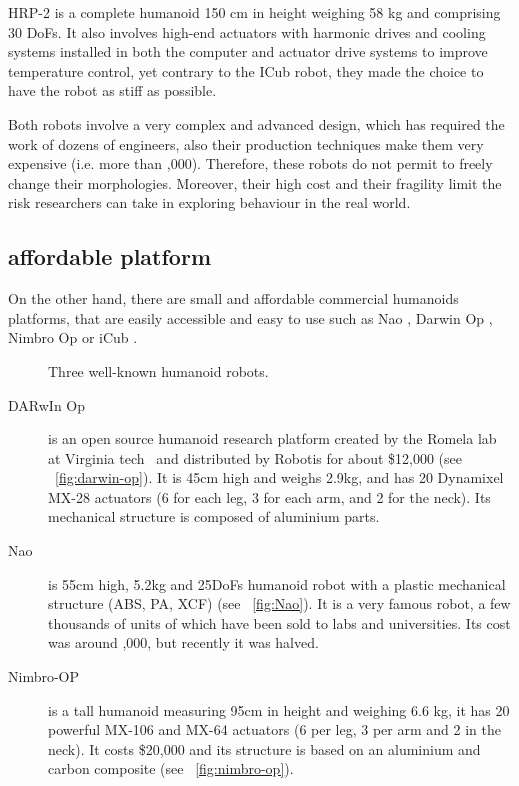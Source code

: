 HRP-2 is a complete humanoid 150 cm in height weighing 58 kg and comprising 30 DoFs. It also involves high-end actuators with harmonic drives and cooling systems installed in both the computer and actuator drive systems to improve temperature control, yet contrary to the ICub robot, they made the choice to have the robot as stiff as possible.

Both robots involve a very complex and advanced design, which has required the work of dozens of engineers, also their production techniques make them very expensive (i.e. more than ,000). Therefore, these robots do not permit to freely change their morphologies. Moreover, their high cost and their fragility limit the risk researchers can take in exploring behaviour in the real world.



\subsection{affordable platform} %

On the other hand, there are small and affordable commercial humanoids platforms, that are easily accessible and easy to use such as Nao \cite{gouaillier2008nao}, Darwin Op \cite{ha2011development}, Nimbro Op \cite{schwarznimbro} or iCub \cite{metta2008icub}.

\begin{figure}[tb]
\centering
    \hfil
    \hfil
    \caption{Three well-known humanoid robots.}
    \label{fig:kumotek_robots}
\end{figure}


\begin{description}
    \item[DARwIn Op] is an open source humanoid research platform created by the Romela lab at Virginia tech~\parencite{ha2011development} and distributed by Robotis for about \$12,000 (see \figurename~\ref{fig:darwin-op}). It is 45cm high and weighs 2.9kg, and has 20 Dynamixel MX-28 actuators (6 for each leg, 3 for each arm, and 2 for the neck). Its mechanical structure is composed of aluminium parts.
    \item[Nao] is 55cm high, 5.2kg and 25DoFs humanoid robot with a plastic mechanical structure (ABS, PA, XCF) (see \figurename~\ref{fig:Nao}). It is a very famous robot, a few thousands of units of which have been sold to labs and universities. Its cost was around ,000, but recently it was halved.
    \item[Nimbro-OP] is a tall humanoid measuring 95cm in height and weighing 6.6 kg, it has 20 powerful MX-106 and MX-64 actuators (6 per leg, 3 per arm and 2 in the neck). It costs \$20,000 and its structure is based on an aluminium and carbon composite (see \figurename~\ref{fig:nimbro-op}).
\end{description}

